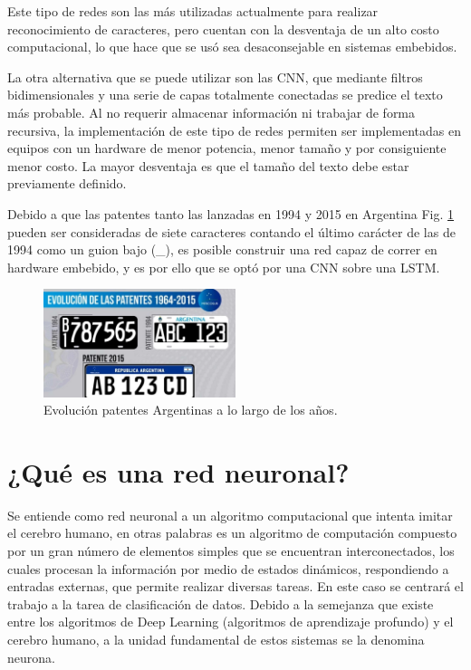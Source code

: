 Este tipo de redes son las más utilizadas actualmente para realizar reconocimiento de caracteres, pero cuentan con la desventaja de un alto costo computacional, lo que hace que se usó sea desaconsejable en sistemas embebidos.

La otra alternativa que se puede utilizar son las CNN, que mediante filtros bidimensionales y una serie de capas totalmente conectadas se predice el texto más probable.
Al no requerir almacenar información ni trabajar de forma recursiva, la implementación
de este tipo de redes permiten ser implementadas en equipos con un hardware de menor potencia, menor tamaño y por consiguiente menor costo. La mayor desventaja es que el tamaño del texto debe estar previamente definido.

Debido a que las patentes tanto las lanzadas en 1994 y 2015 en Argentina Fig. \ref{fig:patentes-arg} pueden ser consideradas de siete caracteres contando el último carácter de las de 1994 como un guion bajo (\_), es posible construir una red capaz de correr en hardware embebido, y es por ello que se optó por una CNN sobre una LSTM.

\begin{figure}[h]
    \centering
    \includegraphics[width=0.5\textwidth]{imgs/patentes-arg.png}
    \caption{Evolución patentes Argentinas a lo largo de los años.}
    \label{fig:patentes-arg}
\end{figure}


\section{¿Qué es una red neuronal?}

Se entiende como red neuronal a un algoritmo computacional que intenta imitar el cerebro humano, en otras palabras es un algoritmo de computación compuesto por un gran número de elementos simples que se
encuentran interconectados, los cuales procesan la información por medio de estados dinámicos, respondiendo a entradas externas, que permite realizar diversas tareas.
En este caso se centrará el trabajo a la tarea de clasificación de datos.
Debido a la semejanza que existe entre los algoritmos de Deep Learning \cite{ibm_que_nodate} (algoritmos de aprendizaje profundo) y el cerebro humano, a la unidad fundamental de estos sistemas se la denomina neurona.


